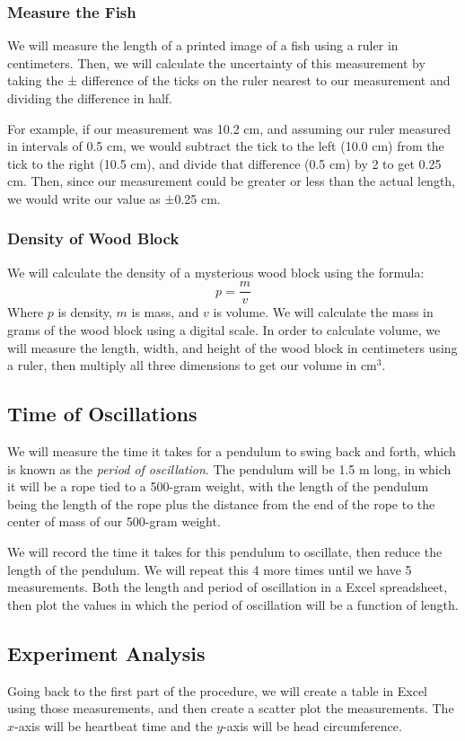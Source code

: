 \documentclass{article}
\begin{document}
\subsubsection{Measure the Fish}
We will measure the length of a printed image of a fish using a ruler in centimeters. Then, we will calculate
the uncertainty of this measurement by taking the ± difference of the ticks on the ruler nearest to our
measurement and dividing the difference in half.

For example, if our measurement was 10.2 cm, and assuming our ruler measured in intervals of 0.5 cm, we
would subtract the tick to the left (10.0 cm) from the tick to the right (10.5 cm), and divide that difference
(0.5 cm) by 2 to get 0.25 cm. Then, since our measurement could be greater or less than the actual length,
we would write our value as ±0.25 cm.

\subsubsection{Density of Wood Block}
We will calculate the density of a mysterious wood block using the formula:
\[ p = \frac{m}{v}\]
Where $p$ is density, $m$ is mass, and $v$ is volume. 
We will calculate the mass in grams of the wood block using a digital scale. 
In order to calculate volume, we will measure the length, width, and height of 
the wood block in centimeters using a ruler, then multiply all three dimensions to 
get our volume in $\mathrm{cm}^3$.

\subsection{Time of Oscillations}
We will measure the time it takes for a pendulum to swing back and forth, which is known 
as the \emph{period of oscillation}. The pendulum will be 1.5 m long, in which it will be a rope tied 
to a 500-gram weight, with the length of the pendulum being the length of the rope plus the 
distance from the end of the rope to the center of mass of our 500-gram weight.

We will record the time it takes for this pendulum to oscillate, then reduce the length of 
the pendulum. We will repeat this 4 more times until we have 5 measurements. Both the length 
and period of oscillation in a Excel spreadsheet, then plot the values in which the period of 
oscillation will be a function of length.  

\subsection{Experiment Analysis}
Going back to the first part of the procedure, we will create a table in Excel using 
those measurements, and then create a scatter plot the measurements. The $x$-axis will 
be heartbeat time and the $y$-axis will be head circumference. 
\end{document}
